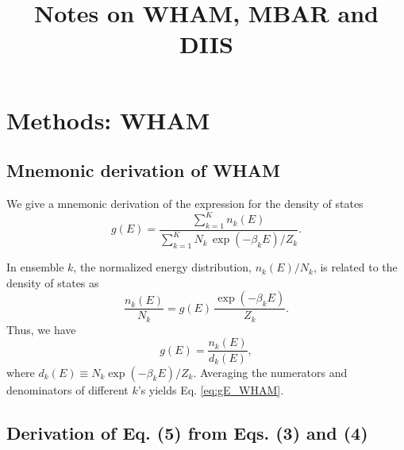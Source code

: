 \documentclass[aip,jcp,preprint,notitlepage, superscriptaddress]{revtex4-1}
\begin{document}
\renewcommand{\theequation}{N.\arabic{equation}}

\newcommand{\vct}[1]{\mathbf{#1}}
\newcommand{\vx}{\vct{x}}
\newcommand{\vy}{\vct{y}}
\newcommand{\Z}{\mathcal{Z}}
\newcommand{\E}{\mathcal{E}}
\newcommand{\Ham}{\mathcal{H}}
\newcommand{\W}{\mathcal{W}}




\title{Notes on WHAM, MBAR and DIIS}

\maketitle



\section{Methods: WHAM}



\subsection{Mnemonic derivation of WHAM}



We give a mnemonic derivation of the expression
for the density of states
%
\begin{equation}
g(E)
=
\frac{
  \sum_{k = 1}^K n_k(E)
}
{
  \sum_{k = 1}^K N_k \, \exp(-\beta_k E) / Z_k
}.
\label{eq:gE_WHAM}
\end{equation}
%

In ensemble $k$,
the normalized energy distribution,
$n_k(E) / N_k$,
is related to the density of states as
%
\begin{equation}
\frac{ n_k(E) } { N_k }
=
g(E) \,
\frac{ \exp(-\beta_k E) } { Z_k }.
\end{equation}
%
Thus,
we have
%
\begin{equation}
g(E)
=
\frac{ n_k(E) }
     { d_k(E) },
\label{eq:gE_single}
\end{equation}
where
$d_k(E) \equiv N_k \exp(-\beta_k E) / Z_k$.
%
Averaging the numerators and denominators of different $k$'s
yields Eq. \eqref{eq:gE_WHAM}.



\subsection{Derivation of Eq. (5) from Eqs. (3) and (4)}
\end{document}

